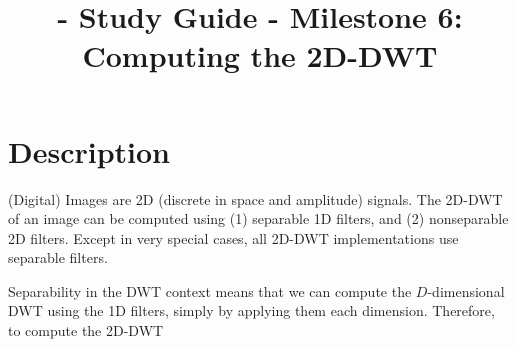
\title{\SM{} - Study Guide - Milestone 6: Computing the 2D-DWT}

\maketitle

\section{Description}

(Digital) Images are 2D (discrete in space and amplitude) signals. The
2D-DWT of an image can be computed using (1) separable 1D filters, and
(2) nonseparable 2D filters. Except in very special cases, all 2D-DWT
implementations use separable filters.

Separability in the DWT context means that we can compute the
$D$-dimensional DWT using the 1D filters, simply by applying them each
dimension. Therefore, to compute the 2D-DWT
